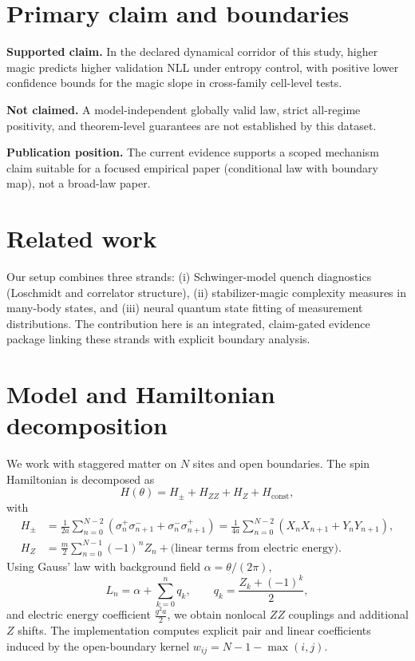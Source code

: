 \documentclass[11pt]{article}
\begin{document}
\section{Primary claim and boundaries}
\textbf{Supported claim.} In the declared dynamical corridor of this study, higher magic predicts higher validation NLL under entropy control, with positive lower confidence bounds for the magic slope in cross-family cell-level tests.

\textbf{Not claimed.} A model-independent globally valid law, strict all-regime positivity, and theorem-level guarantees are not established by this dataset.

\textbf{Publication position.} The current evidence supports a scoped mechanism claim suitable for a focused empirical paper (conditional law with boundary map), not a broad-law paper.

\section{Related work}
Our setup combines three strands: (i) Schwinger-model quench diagnostics (Loschmidt and correlator structure), (ii) stabilizer-magic complexity measures in many-body states, and (iii) neural quantum state fitting of measurement distributions. The contribution here is an integrated, claim-gated evidence package linking these strands with explicit boundary analysis.

\section{Model and Hamiltonian decomposition}
We work with staggered matter on $N$ sites and open boundaries. The spin Hamiltonian is decomposed as
\begin{equation}
H(\theta)=H_{\pm}+H_{ZZ}+H_Z+H_\mathrm{const},
\end{equation}
with
\begin{align}
H_{\pm} &= \frac{1}{2a}\sum_{n=0}^{N-2}\left(\sigma_n^+\sigma_{n+1}^-+\sigma_n^-\sigma_{n+1}^+\right)
=\frac{1}{4a}\sum_{n=0}^{N-2}(X_nX_{n+1}+Y_nY_{n+1}),\\
H_Z &= \frac{m}{2}\sum_{n=0}^{N-1}(-1)^n Z_n + \text{(linear terms from electric energy)}.
\end{align}
Using Gauss' law with background field $\alpha=\theta/(2\pi)$,
\begin{equation}
L_n = \alpha + \sum_{k=0}^n q_k,\qquad q_k = \frac{Z_k+(-1)^k}{2},
\end{equation}
and electric energy coefficient $\frac{g^2a}{2}$, we obtain nonlocal $ZZ$ couplings and additional $Z$ shifts. The implementation computes explicit pair and linear coefficients induced by the open-boundary kernel $w_{ij}=N-1-\max(i,j)$.
\end{document}
